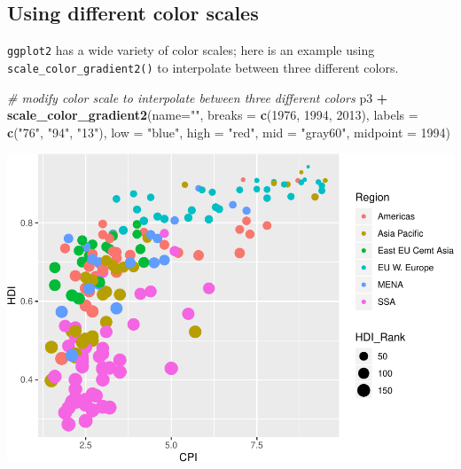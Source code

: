 \documentclass[
]{book}
\newenvironment{Shaded}{\begin{snugshade}}{\end{snugshade}}
\newcommand{\CommentTok}[1]{\textcolor[rgb]{0.56,0.35,0.01}{\textit{#1}}}
\newcommand{\DataTypeTok}[1]{\textcolor[rgb]{0.13,0.29,0.53}{#1}}
\newcommand{\DecValTok}[1]{\textcolor[rgb]{0.00,0.00,0.81}{#1}}
\newcommand{\KeywordTok}[1]{\textcolor[rgb]{0.13,0.29,0.53}{\textbf{#1}}}
\newcommand{\NormalTok}[1]{#1}
\newcommand{\OperatorTok}[1]{\textcolor[rgb]{0.81,0.36,0.00}{\textbf{#1}}}
\newcommand{\StringTok}[1]{\textcolor[rgb]{0.31,0.60,0.02}{#1}}
\begin{document}
\hypertarget{using-different-color-scales}{%
\subsection{Using different color scales}\label{using-different-color-scales}}

\texttt{ggplot2} has a wide variety of color scales; here is an example using \texttt{scale\_color\_gradient2()} to interpolate between three different colors.

\begin{Shaded}
\begin{Highlighting}[]
\CommentTok{\# modify color scale to interpolate between three different colors}
\NormalTok{p3 }\OperatorTok{+}
\StringTok{  }\KeywordTok{scale\_color\_gradient2}\NormalTok{(}\DataTypeTok{name=}\StringTok{""}\NormalTok{,}
                        \DataTypeTok{breaks =} \KeywordTok{c}\NormalTok{(}\DecValTok{1976}\NormalTok{, }\DecValTok{1994}\NormalTok{, }\DecValTok{2013}\NormalTok{),}
                        \DataTypeTok{labels =} \KeywordTok{c}\NormalTok{(}\StringTok{"\textquotesingle{}76"}\NormalTok{, }\StringTok{"\textquotesingle{}94"}\NormalTok{, }\StringTok{"\textquotesingle{}13"}\NormalTok{),}
                        \DataTypeTok{low =} \StringTok{"blue"}\NormalTok{,}
                        \DataTypeTok{high =} \StringTok{"red"}\NormalTok{,}
                        \DataTypeTok{mid =} \StringTok{"gray60"}\NormalTok{,}
                        \DataTypeTok{midpoint =} \DecValTok{1994}\NormalTok{)}
\end{Highlighting}
\end{Shaded}

\includegraphics{R/Rgraphics/figures/unnamed-chunk-201-1.pdf}
\end{document}
